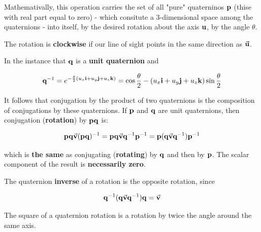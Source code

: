 Mathemativally, this operation carries the set of all "pure" quaterninos
$ \mathbf{p} $ (thise with real part equal to zero) - which consitute a 3-dimensional
space among the quaternions - into itself, by the desired rotation about the axis
$ \mathbf{u} $, by the angle $ \theta $.

The rotation is \textbf{clockwise} if our line of sight points in the same direction
as $ \vec{\mathbf{u}} $.

In the instance that $ \mathbf{q} $ is a \textbf{unit quaternion} and

\begin{equation}
    \mathbf{q}^{-1} = e^{-\frac{\theta}{2} ( u_x \mathbf{i} + u_y \mathbf{j} + u_z \mathbf{k} )}
    = \cos \frac{\theta}{2} - ( u_x \mathbf{i} + u_y \mathbf{j} + u_z \mathbf{k} ) \sin \frac{\theta}{2}
\end{equation}

It follows that conjugation by the product of two quaternions is the composition of
conjugations by these quaternions. If $ \mathbf{p} $ and $ \mathbf{q} $ are unit quaternions,
then conjugation (\textbf{rotation}) by $ \mathbf{p} \mathbf{q} $ is:

\begin{equation}
    \mathbf{p} \mathbf{q} \vec{\mathbf{v}} ( \mathbf{p} \mathbf{q} )^{-1}
    = \mathbf{p} \mathbf{q} \vec{\mathbf{v}} \mathbf{q}^{-1} \mathbf{p}^{-1}
    = \mathbf{p} ( \mathbf{q} \vec{\mathbf{v}} \mathbf{q}^{-1} ) \mathbf{p}^{-1}
\end{equation}

which is \textbf{the same} as conjugating (\textbf{rotating}) by $ \mathbf{q} $ and
then by $ \mathbf{p} $. The scalar component of the result is \textbf{necessarily zero}.

The quaternion \textbf{inverse} of a rotation is the opposite rotation, since

\begin{equation}
    \mathbf{q}^{-1} (\mathbf{q} \vec{\mathbf{v}} \mathbf{q}^{-1} ) \mathbf{q} = \vec{\mathbf{v}}
\end{equation}

The square of a quaternion rotation is a rotation by twice the angle around the same axis.



